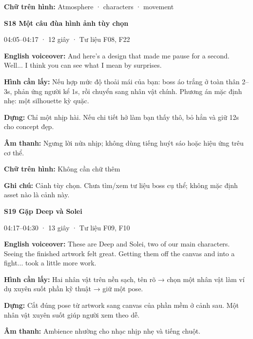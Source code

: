 \documentclass[10pt,a4paper]{article}
\begin{document}
\textbf{Chữ trên hình:}  Atmosphere · characters · movement\par

\textbf{S18 Một câu đùa hình ảnh tùy chọn}\par

04:05–04:17 · 12 giây · Tư liệu F08, F22\par

\textbf{English voiceover:}  And here’s a design that made me pause for a second. Well... I think you can see what I mean by surprises.\par

\textbf{Hình cần lấy:}  Nếu hợp mức độ thoải mái của bạn: boss áo trắng ở toàn thân 2–3s, phản ứng người kể 1s, rồi chuyển sang nhân vật chính. Phương án mặc định nhẹ: một silhouette kỳ quặc.\par

\textbf{Dựng:}  Chỉ một nhịp hài. Nếu chi tiết hở làm bạn thấy thô, bỏ hẳn và giữ 12s cho concept đẹp.\par

\textbf{Âm thanh:}  Ngưng lời nửa nhịp; không dùng tiếng huýt sáo hoặc hiệu ứng trêu cơ thể.\par

\textbf{Chữ trên hình:}  Không cần chữ thêm\par

\textbf{Ghi chú:}  Cảnh tùy chọn. Chưa tìm/xem tư liệu boss cụ thể; không mặc định asset nào là cảnh này.\par

\textbf{S19 Gặp Deep và Solei}\par

04:17–04:30 · 13 giây · Tư liệu F09, F10\par

\textbf{English voiceover:}  These are Deep and Solei, two of our main characters. Seeing the finished artwork felt great. Getting them off the canvas and into a fight... took a little more work.\par

\textbf{Hình cần lấy:}  Hai nhân vật trên nền sạch, tên rõ → chọn một nhân vật làm ví dụ xuyên suốt phần kỹ thuật → giữ một pose.\par

\textbf{Dựng:}  Cắt đúng pose từ artwork sang canvas của phần mềm ở cảnh sau. Một nhân vật xuyên suốt giúp người xem theo dễ.\par

\textbf{Âm thanh:}  Ambience nhường cho nhạc nhịp nhẹ và tiếng chuột.\par
\end{document}
